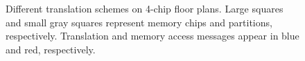 \begin{figure}[h!]
\centering
 \subfloat[Baseline.]{
  \label{fig:baseline}
   \texttt{[image: figures/floorplan\_vanilavm2.pdf]}
   }

 \subfloat[Per-Chip MMU.]{
  \label{fig:chipmmu}
 \texttt{[image: figures/floorplan\_chipvm2.pdf]}
 }

 \subfloat[Per-Partition MMU.]{
  \label{fig:partitionmmu}
 \texttt{[image: figures/floorplan\_partitionvm2.pdf]}
 }

\caption{Different translation schemes on 4-chip floor plans. Large squares and small gray squares represent memory chips and partitions, respectively. Translation and memory access messages appear in blue and red, respectively. 
 \label{fig:translationSchemes_comparison}}
\end{figure}